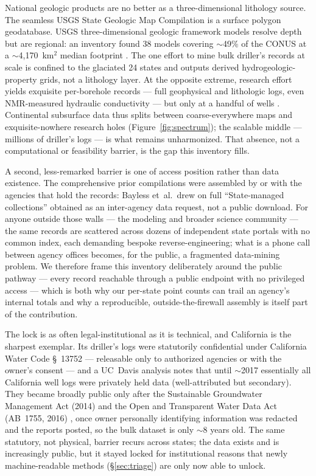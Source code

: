 \documentclass[12pt]{article}
\begin{document}
National geologic products are no better as a three-dimensional lithology source. The seamless USGS State
Geologic Map Compilation \citep{horton2017sgmc} is a surface polygon geodatabase. USGS
three-dimensional geologic framework models resolve depth but are regional: an inventory found 38 models
covering $\sim$49\% of the CONUS at a $\sim$4{,}170~km$^2$ median footprint \citep{usgs2023inventory}. The
one effort to mine bulk driller's records at scale \citep[$\sim$14M logs;][]{bayless2017} is confined to
the glaciated 24 states and outputs derived hydrogeologic-property grids, not a lithology layer. At the
opposite extreme, research effort yields exquisite per-borehole records --- full geophysical and lithologic
logs, even NMR-measured hydraulic conductivity --- but only at a handful of wells
\citep[e.g.,][n$=$2 and n$=$4]{twining2017ds1058,uhlemann2019eastriver}. Continental subsurface data thus
splits between coarse-everywhere maps and exquisite-nowhere research holes (Figure~\ref{fig:spectrum}); the
scalable middle --- millions of driller's logs --- is what remains unharmonized. That absence, not a
computational or feasibility barrier, is the gap this inventory fills.

A second, less-remarked barrier is one of access position rather than data existence. The
comprehensive prior compilations were assembled by or with the agencies that hold the records: Bayless
et~al.\ drew on full ``State-managed collections'' obtained as an inter-agency data request, not a public
download. For anyone outside those walls --- the modeling and broader science community --- the same
records are scattered across dozens of independent state portals with no common index, each demanding
bespoke reverse-engineering; what is a phone call between agency offices becomes, for the public, a
fragmented data-mining problem. We therefore frame this inventory deliberately around the public
pathway --- every record reachable through a public endpoint with no privileged access --- which is both why
our per-state point counts can trail an agency's internal totals and why a reproducible, outside-the-firewall
assembly is itself part of the contribution.

The lock is as often legal-institutional as it is technical, and California is the sharpest
exemplar. Its driller's logs were statutorily confidential under California Water Code \S~13752
\citep{ca_watercode_13752} --- releasable only to authorized agencies or with the owner's consent --- and a
UC~Davis analysis notes that until $\sim$2017 essentially all California well logs were privately held data
(well-attributed but secondary). They became broadly public only after the Sustainable Groundwater
Management Act (2014) and the Open and Transparent Water Data Act (AB~1755, 2016)
\citep{ca_ab1755}, once owner personally identifying information was redacted and the reports posted, so the
bulk dataset is only $\sim$8 years old. The same statutory, not physical, barrier recurs across states; the
data exists and is increasingly public, but it stayed locked for institutional reasons that newly
machine-readable methods (\S\ref{sec:triage}) are only now able to unlock.
\end{document}
